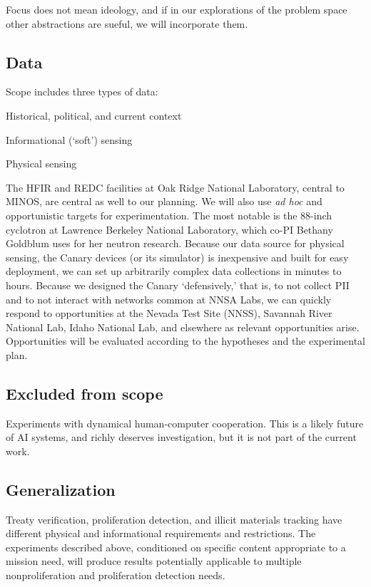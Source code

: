 \documentclass{article} %
\begin{document}
Focus does not mean ideology, and if in our explorations of the problem space other abstractions are sueful, we will incorporate them.

\subsection{Data}
Scope includes three types of data:
\begin{itemize*}
\item Historical, political, and current context
\item Informational (`soft') sensing
\item Physical sensing
\end{itemize*}

The HFIR and REDC facilities at Oak Ridge National Laboratory, central to MINOS, are central as well to our planning. We will also use \textit{ad hoc} and opportunistic targets for experimentation. The most notable is the 88-inch cyclotron at Lawrence Berkeley National Laboratory, which co-PI Bethany Goldblum uses for her neutron research. Because our data source for physical sensing, the Canary devices (or its simulator) is inexpensive and built for easy deployment, we can set up arbitrarily complex data collections in minutes to hours. Because we designed the Canary `defensively,' that is, to not collect PII and to not interact with networks common at NNSA Labs, we can quickly respond to opportunities at the Nevada Test Site (NNSS), Savannah River National Lab, Idaho National Lab, and elsewhere as relevant opportunities arise. Opportunities will be evaluated according to the hypotheses and the experimental plan.

\subsection{Excluded from scope}
Experiments with dynamical human-computer cooperation. This is a likely future of AI systems, and richly deserves investigation, but it is not part of the current work.

\subsection{Generalization}
Treaty verification, proliferation detection, and illicit materials tracking have different physical and informational requirements and restrictions. The experiments described above, conditioned on specific content appropriate to a mission need, will produce results potentially applicable to multiple nonproliferation and proliferation detection needs.
\end{document}
